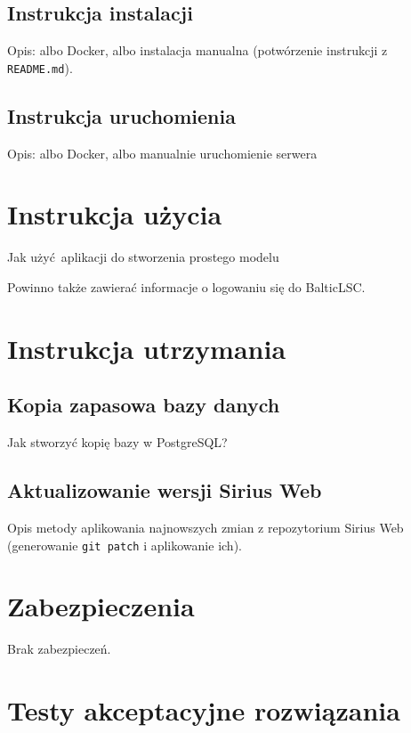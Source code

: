 \subsection{Instrukcja instalacji}

Opis: albo Docker, albo instalacja manualna (potwórzenie instrukcji z
\texttt{README.md}).

\subsection{Instrukcja uruchomienia}

Opis: albo Docker, albo manualnie uruchomienie serwera

\section{Instrukcja użycia}

Jak użyć aplikacji do stworzenia prostego modelu

Powinno także zawierać informacje o logowaniu się do BalticLSC\@.

\section{Instrukcja utrzymania}

\subsection{Kopia zapasowa bazy danych}

Jak stworzyć kopię bazy w PostgreSQL\@?

\subsection{Aktualizowanie wersji Sirius Web}

Opis metody aplikowania najnowszych zmian z repozytorium Sirius Web
(generowanie \texttt{git patch} i aplikowanie ich).

\section{Zabezpieczenia}

Brak zabezpieczeń.

\section{Testy akceptacyjne rozwiązania}

